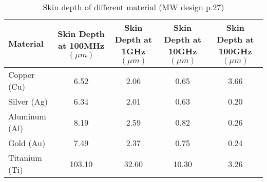 \begin{table}
\caption{Skin depth of different material (MW design p.27)}
\begin{tabular}{l|c|c|c|c}
\toprule
Material & \makecell{Skin Depth\\at 100MHz $(\unit{\mu m})$} & \makecell{Skin Depth\\at 1GHz $(\unit{\mu m})$} & \makecell{Skin Depth\\at 10GHz $(\unit{\mu m})$} & \makecell{Skin Depth\\at 100GHz $(\unit{\mu m})$} \\
\midrule
\hline
Copper (Cu) & 6.52 & 2.06 & 0.65 & 3.66 \\
Silver (Ag) & 6.34 & 2.01 & 0.63 & 0.20 \\
Aluminum (Al) & 8.19 & 2.59 & 0.82 & 0.26 \\
Gold (Au) & 7.49 & 2.37 & 0.75 & 0.24 \\
Titanium (Ti) & 103.10 & 32.60 & 10.30 & 3.26 \\
\bottomrule
\end{tabular}
\end{table}